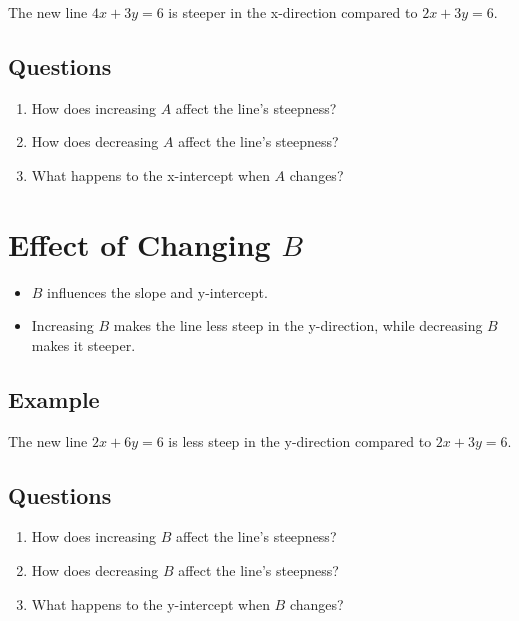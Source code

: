 \documentclass[12pt]{article}
\begin{document}
The new line \(4x + 3y = 6\) is steeper in the x-direction compared to \(2x + 3y = 6\).

\subsection*{Questions}
\begin{enumerate}
    \item How does increasing \(A\) affect the line's steepness?
    \item How does decreasing \(A\) affect the line's steepness?
    \item What happens to the x-intercept when \(A\) changes?
\end{enumerate}

\newpage

\section*{Effect of Changing \(B\)}

\begin{itemize}
    \item \(B\) influences the slope and y-intercept.
    \item Increasing \(B\) makes the line less steep in the y-direction, while decreasing \(B\) makes it steeper.
\end{itemize}

\subsection*{Example}


The new line \(2x + 6y = 6\) is less steep in the y-direction compared to \(2x + 3y = 6\).

\subsection*{Questions}
\begin{enumerate}
    \item How does increasing \(B\) affect the line's steepness?
    \item How does decreasing \(B\) affect the line's steepness?
    \item What happens to the y-intercept when \(B\) changes?
\end{enumerate}
\end{document}

